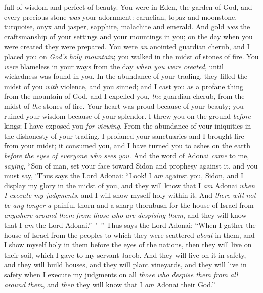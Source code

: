 \begin{biblechapter}
full of wisdom and perfect of beauty.
\verse You were in Eden, the garden of God, 
and every precious stone \textit{was} your adornment: 
carnelian, topaz and moonstone, 
turquoise, onyx and jasper, 
sapphire, malachite and emerald. 
And gold \textit{was} the craftsmanship of your settings 
and your mountings in you; 
on the day when you were created they were prepared.
\verse You were \textit{an} anointed guardian cherub, 
and I placed you on \textit{God’s holy mountain}; 
you walked in the midst of stones of fire.
\verse You \textit{were} blameless in your ways 
from the day \textit{when you were created}, 
until wickedness was found in you.
\verse In the abundance of your trading, 
they filled the midst of you \textit{with} violence, and you sinned; 
and I cast you as a profane thing from the mountain of God, 
and I expelled you, \textit{the} guardian cherub, 
from the midst of \textit{the} stones of fire.
\verse Your heart was proud because of your beauty; 
you ruined your wisdom because of your splendor. 
I threw you on the ground \textit{before} kings; 
I have exposed you \textit{for viewing}.
\verse From the abundance of your iniquities 
in the dishonesty of your trading, 
I profaned your sanctuaries 
and I brought fire from your midst; 
it consumed you, and I have turned you to ashes on the earth 
\textit{before the eyes of everyone who sees you}.
\verse And the word of Adonai \textit{came} to me, \textit{saying},
\verse “Son of man, set your face toward Sidon and prophesy against it,
\verse and you must say, ‘Thus says the Lord Adonai:
\verse “Look! I \textit{am} against you, Sidon, 
and I display my glory in the midst of you, 
and they will know that I \textit{am} Adonai 
\textit{when I execute my judgments}, 
and I will show myself holy within it.
\verse And \textit{there will not be any longer} \textit{a} painful thorn and a sharp thornbush for the house of Israel from \textit{anywhere around them} \textit{from those} \textit{who are despising them}, and they will know that I \textit{am} the Lord Adonai.” ’ ”
\verse Thus says the Lord Adonai: “When I gather the house of Israel from the peoples to which they were scattered \textit{about} in them, and I show myself holy in them before the eyes of the nations, then they will live on their soil, which I gave to my servant Jacob.
\verse And they will live on it in safety, and they will build houses, and they will plant vineyards, and they will live in safety when I execute my judgments on all \textit{those who despise them from all around them}, and \textit{then} they will know that I \textit{am} Adonai their God.”
\end{biblechapter}

